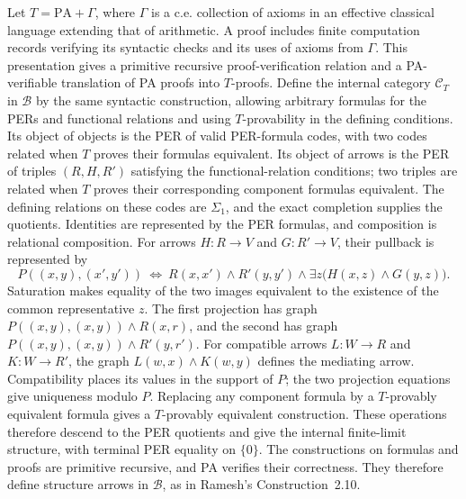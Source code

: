 \documentclass[11pt]{article}
\theoremstyle{definition}
\theoremstyle{remark}
\begin{document}
Let $T=\mathrm{PA}+\Gamma$, where $\Gamma$ is a c.e. collection
of axioms in an effective classical language extending that of
arithmetic. A proof includes finite computation records verifying
its syntactic checks and its uses of axioms from $\Gamma$.
This presentation gives a
primitive recursive proof-verification relation and a
PA-verifiable translation of PA proofs into $T$-proofs.
Define the internal category $\mathcal C_T$ in $\mathcal B$
by the same syntactic construction, allowing arbitrary formulas
for the PERs and functional relations and using $T$-provability
in the defining conditions. Its object of objects is the PER of
valid PER-formula codes, with two codes related when $T$ proves
their formulas equivalent. Its object of arrows is the PER of
triples $(R,H,R')$ satisfying the functional-relation conditions;
two triples are related when $T$ proves their corresponding
component formulas equivalent.
The defining relations on these codes are $\Sigma_1$, and the
exact completion supplies the quotients. Identities are represented
by the PER formulas, and composition is relational composition.
For arrows $H:R\to V$ and $G:R'\to V$, their pullback is represented by
\[
 P((x,y),(x',y'))\ \Longleftrightarrow\
 R(x,x')\wedge R'(y,y')\wedge
 \exists z\bigl(H(x,z)\wedge G(y,z)\bigr).
\]
Saturation makes equality of the two images equivalent to the
existence of the common representative $z$. The first projection
has graph $P((x,y),(x,y))\wedge R(x,r)$, and the second has
graph $P((x,y),(x,y))\wedge R'(y,r')$.
For compatible arrows $L:W\to R$ and $K:W\to R'$, the graph
$L(w,x)\wedge K(w,y)$ defines the mediating arrow.
Compatibility places its values in the support of $P$;
the two projection equations give uniqueness modulo $P$.
Replacing any component formula by a $T$-provably equivalent
formula gives a $T$-provably equivalent construction. These
operations therefore descend to the PER quotients and give the
internal finite-limit structure, with terminal PER equality on
$\{0\}$. The constructions on formulas and proofs are primitive
recursive, and PA verifies their correctness. They therefore
define structure arrows in $\mathcal B$, as in Ramesh's
Construction~2.10.
\end{document}
